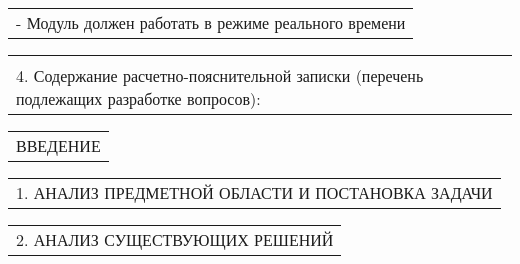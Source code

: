 \documentclass[12pt, А4, twoside]{article}
\begin{document}
\begin{FlushLeft}
    \vspace{-0.1 cm}

    \begin{tabular}{p{17.25cm}} 
        \hspace{0.6cm} \textsf{- Модуль должен работать в режиме реального времени}\vspace{0pt} \hline 
    \end{tabular}   

    \vspace{-0.1 cm}
    
    \begin{tabular}{p{17.25cm}}
        \vspace{0pt} \hline \\
        \textsf{4. Содержание расчетно-пояснительной записки (перечень подлежащих разработке вопросов):} \vspace{0pt} \hline \\
    \end{tabular} 
    
    \vspace{-0.1 cm}

    \begin{tabular}{p{17.25cm}} 
        \hspace{0.3cm} \textsf{ВВЕДЕНИЕ} \vspace{0pt} \hline \\
    \end{tabular} 

    \vspace{-0.1 cm}

    \begin{tabular}{p{17.25cm}}
        \hspace{0.3cm} \textsf{1. АНАЛИЗ ПРЕДМЕТНОЙ ОБЛАСТИ И ПОСТАНОВКА ЗАДАЧИ} \vspace{0pt} \hline \\
    \end{tabular}  

    \vspace{-0.1 cm}

    \begin{tabular}{p{17.25cm}} 
        \hspace{0.3cm} \textsf{2. АНАЛИЗ СУЩЕСТВУЮЩИХ РЕШЕНИЙ} \vspace{0pt} \hline \\
    \end{tabular} 

    \vspace{-0.1 cm}


\end{FlushLeft}
\end{document}
